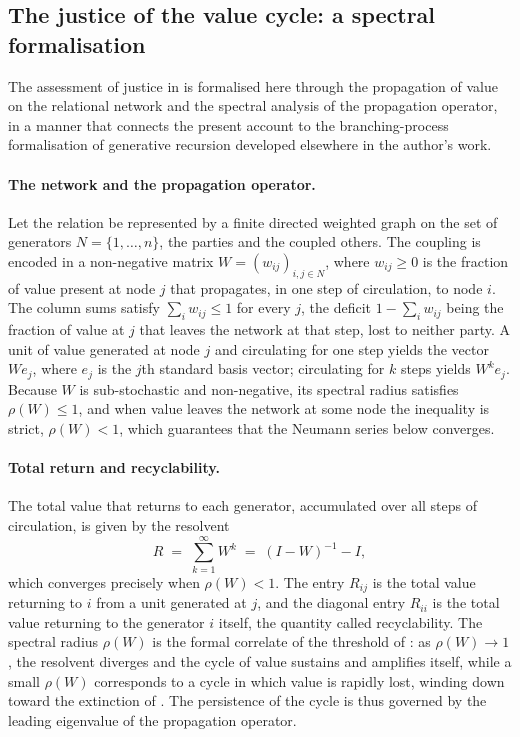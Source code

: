 \subsection{The justice of the value cycle: a spectral formalisation}
\label{p11:sec:app-justice}

The assessment of justice in  is formalised here through the propagation of value on the relational network and the spectral analysis of the propagation operator, in a manner that connects the present account to the branching-process formalisation of generative recursion developed elsewhere in the author's work.

\paragraph{The network and the propagation operator.}
Let the relation be represented by a finite directed weighted graph on the set of generators $N = \{1, \dots, n\}$, the parties and the coupled others. The coupling is encoded in a non-negative matrix $W = (w_{ij})_{i,j \in N}$, where $w_{ij} \geq 0$ is the fraction of value present at node $j$ that propagates, in one step of circulation, to node $i$. The column sums satisfy $\sum_{i} w_{ij} \leq 1$ for every $j$, the deficit $1 - \sum_i w_{ij}$ being the fraction of value at $j$ that leaves the network at that step, lost to neither party. A unit of value generated at node $j$ and circulating for one step yields the vector $W e_j$, where $e_j$ is the $j$th standard basis vector; circulating for $k$ steps yields $W^k e_j$. Because $W$ is sub-stochastic and non-negative, its spectral radius satisfies $\rho(W) \leq 1$, and when value leaves the network at some node the inequality is strict, $\rho(W) < 1$, which guarantees that the Neumann series below converges.

\paragraph{Total return and recyclability.}
The total value that returns to each generator, accumulated over all steps of circulation, is given by the resolvent
\[
R \;=\; \sum_{k=1}^{\infty} W^{k} \;=\; (I - W)^{-1} - I ,
\]
which converges precisely when $\rho(W) < 1$. The entry $R_{ij}$ is the total value returning to $i$ from a unit generated at $j$, and the diagonal entry $R_{ii}$ is the total value returning to the generator $i$ itself, the quantity  called recyclability. The spectral radius $\rho(W)$ is the formal correlate of the threshold of : as $\rho(W) \to 1$, the resolvent diverges and the cycle of value sustains and amplifies itself, while a small $\rho(W)$ corresponds to a cycle in which value is rapidly lost, winding down toward the extinction of . The persistence of the cycle is thus governed by the leading eigenvalue of the propagation operator.

